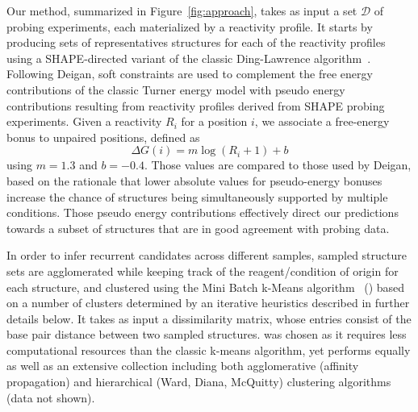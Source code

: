 \documentclass[a4,center,fleqn]{NAR}
\begin{document}
Our method, summarized in Figure~\ref{fig:approach}, takes as input a set $\mathcal{D}$ of probing experiments, each materialized by a reactivity profile. It starts by producing sets of representatives structures for each of the reactivity profiles using a SHAPE-directed variant of the classic Ding-Lawrence algorithm~\citep{Ding2003}. Following Deigan\etal\cite{Deigan2009}, soft constraints are used to complement the free energy contributions of the classic Turner energy model with pseudo energy contributions resulting from reactivity profiles derived from SHAPE probing experiments.  Given a reactivity $R_i$ for a position $i$, we associate a free-energy bonus to unpaired positions, defined as
$$\Delta G(i) = m \log(R_i +1 )+b$$ 
using $m=1.3$ and  $b=-0.4$. Those values are compared to those used by Deigan\etal\cite{Deigan2009}, based on the rationale that lower absolute values for pseudo-energy bonuses increase the chance of structures being simultaneously supported by multiple conditions. Those pseudo energy contributions effectively direct our predictions towards a subset of structures that are in good agreement with probing data. 

In order to infer recurrent candidates across different samples, sampled structure sets are agglomerated while keeping track of the reagent/condition of origin for each structure, and clustered using the Mini Batch k-Means algorithm~\citep{Sculley2010} (\CL{}) based on a number of clusters determined by an iterative heuristics described in further details below. 
It takes as input a dissimilarity matrix, whose entries consist of the base pair distance between two sampled structures.
\CL{} was chosen as it requires less computational resources than the classic k-means algorithm, yet performs equally as well as an extensive collection including  both agglomerative (affinity propagation) and hierarchical (Ward, Diana, McQuitty) clustering algorithms (data not shown). 
\end{document}
